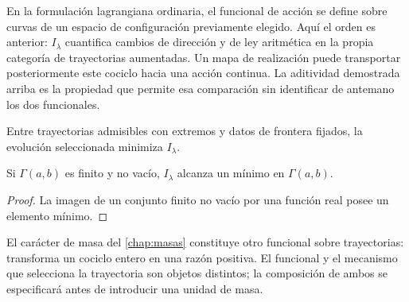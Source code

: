 En la formulación lagrangiana ordinaria, el funcional de acción se define
sobre curvas de un espacio de configuración previamente elegido. Aquí el
orden es anterior: \(I_\lambda\) cuantifica cambios de dirección y de ley
aritmética en la propia categoría de trayectorias aumentadas. Un mapa de
realización puede transportar posteriormente este cociclo hacia una acción
continua. La aditividad demostrada arriba es la propiedad que permite esa
comparación sin identificar de antemano los dos funcionales.

\begin{principle}
Entre trayectorias admisibles con extremos y datos de frontera fijados, la
evolución seleccionada minimiza \(I_\lambda\).
\end{principle}

\begin{proposition}
Si \(\Gamma(a,b)\) es finito y no vacío, \(I_\lambda\) alcanza un mínimo en
\(\Gamma(a,b)\).
\end{proposition}
\begin{proof}
La imagen de un conjunto finito no vacío por una función real posee un
elemento mínimo.
\end{proof}

El carácter de masa del \cref{chap:masas} constituye otro funcional sobre
trayectorias: transforma un cociclo entero en una razón positiva. El
funcional y el mecanismo que selecciona la trayectoria son objetos distintos;
la composición de ambos se especificará antes de introducir una unidad de
masa.
